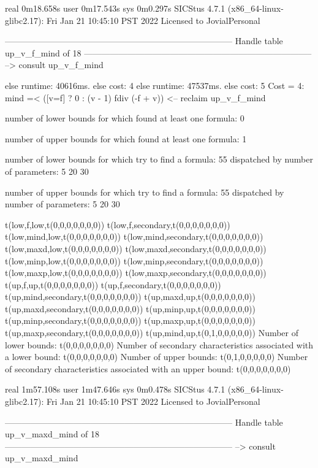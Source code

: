 real	0m18.658s
user	0m17.543s
sys	0m0.297s
SICStus 4.7.1 (x86_64-linux-glibc2.17): Fri Jan 21 10:45:10 PST 2022
Licensed to JovialPersonal


--------------------------------------------------------------------------------
Handle table up_v_f_mind of 18
--------------------------------------------------------------------------------
--> consult up_v_f_mind

else runtime: 40616ms. else cost: 4
else runtime: 47537ms. else cost: 5
Cost =  4:  mind =< ([v=f] ? 0 : (v - 1) fdiv (-f + v)) %
<-- reclaim up_v_f_mind

number of lower bounds for which found at least one formula: 0

number of upper bounds for which found at least one formula: 1

number of lower bounds for which try to find a formula: 55
dispatched by number of parameters: 5  20  30

number of upper bounds for which try to find a formula: 55
dispatched by number of parameters: 5  20  30

t(low,f,low,t(0,0,0,0,0,0,0))
t(low,f,secondary,t(0,0,0,0,0,0,0))
t(low,mind,low,t(0,0,0,0,0,0,0))
t(low,mind,secondary,t(0,0,0,0,0,0,0))
t(low,maxd,low,t(0,0,0,0,0,0,0))
t(low,maxd,secondary,t(0,0,0,0,0,0,0))
t(low,minp,low,t(0,0,0,0,0,0,0))
t(low,minp,secondary,t(0,0,0,0,0,0,0))
t(low,maxp,low,t(0,0,0,0,0,0,0))
t(low,maxp,secondary,t(0,0,0,0,0,0,0))
t(up,f,up,t(0,0,0,0,0,0,0))
t(up,f,secondary,t(0,0,0,0,0,0,0))
t(up,mind,secondary,t(0,0,0,0,0,0,0))
t(up,maxd,up,t(0,0,0,0,0,0,0))
t(up,maxd,secondary,t(0,0,0,0,0,0,0))
t(up,minp,up,t(0,0,0,0,0,0,0))
t(up,minp,secondary,t(0,0,0,0,0,0,0))
t(up,maxp,up,t(0,0,0,0,0,0,0))
t(up,maxp,secondary,t(0,0,0,0,0,0,0))
t(up,mind,up,t(0,1,0,0,0,0,0))
Number of lower bounds:                                             t(0,0,0,0,0,0,0)
Number of secondary characteristics associated with a lower bound:  t(0,0,0,0,0,0,0)
Number of upper bounds:                                             t(0,1,0,0,0,0,0)
Number of secondary characteristics associated with an upper bound: t(0,0,0,0,0,0,0)

real	1m57.108s
user	1m47.646s
sys	0m0.478s
SICStus 4.7.1 (x86_64-linux-glibc2.17): Fri Jan 21 10:45:10 PST 2022
Licensed to JovialPersonal


--------------------------------------------------------------------------------
Handle table up_v_maxd_mind of 18
--------------------------------------------------------------------------------
--> consult up_v_maxd_mind

